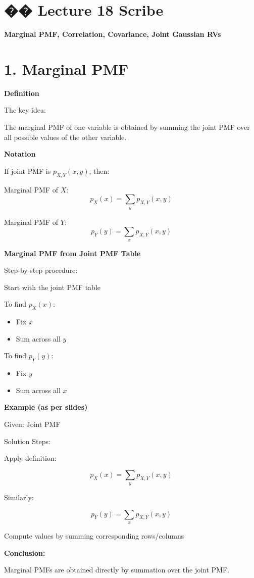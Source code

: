 \documentclass[12pt]{article}
\begin{document}
\section*{�� Lecture 18 Scribe}

\textbf{Marginal PMF, Correlation, Covariance, Joint Gaussian RVs}

\section*{1. Marginal PMF}

\textbf{Definition}

The key idea:

The marginal PMF of one variable is obtained by summing the joint PMF over all possible values of the other variable.

\textbf{Notation}

If joint PMF is $p_{X,Y}(x,y)$, then:

Marginal PMF of $X$:
\[
p_X(x) = \sum_{y} p_{X,Y}(x,y)
\]

Marginal PMF of $Y$:
\[
p_Y(y) = \sum_{x} p_{X,Y}(x,y)
\]

\textbf{Marginal PMF from Joint PMF Table}

Step-by-step procedure:

Start with the joint PMF table

To find $p_X(x)$:
\begin{itemize}
\item Fix $x$
\item Sum across all $y$
\end{itemize}

To find $p_Y(y)$:
\begin{itemize}
\item Fix $y$
\item Sum across all $x$
\end{itemize}

\textbf{Example (as per slides)}

Given: Joint PMF

Solution Steps:

Apply definition:

\[
p_X(x) = \sum_{y} p_{X,Y}(x,y)
\]

Similarly:

\[
p_Y(y) = \sum_{x} p_{X,Y}(x,y)
\]

Compute values by summing corresponding rows/columns

\textbf{Conclusion:}

Marginal PMFs are obtained directly by summation over the joint PMF.
\end{document}

